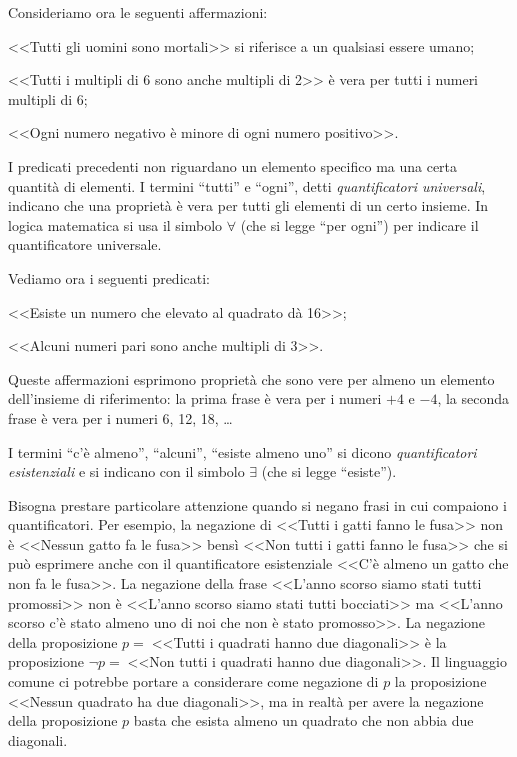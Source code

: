 Consideriamo ora le seguenti affermazioni:
\begin{itemize*}
\item <<Tutti gli uomini sono mortali>> si riferisce a un qualsiasi essere umano;
\item <<Tutti i multipli di 6 sono anche multipli di 2>> è vera per tutti i numeri multipli di 6;
\item <<Ogni numero negativo è minore di ogni numero positivo>>.
\end{itemize*}
I predicati precedenti non riguardano un elemento specifico ma una certa quantità di elementi. I termini ``tutti'' e ``ogni'', detti \emph{quantificatori universali}, indicano che una proprietà è vera per tutti gli elementi di un certo insieme. In logica matematica si usa il simbolo $\forall$ (che si legge ``per ogni'') per indicare il quantificatore universale.

Vediamo ora i seguenti predicati:
\begin{itemize*}
\item <<Esiste un numero che elevato al quadrato dà 16>>;
\item <<Alcuni numeri pari sono anche multipli di 3>>.
\end{itemize*}
Queste affermazioni esprimono proprietà che sono vere per almeno un elemento dell'insieme di riferimento: la prima frase è vera per i numeri $+4$ e $-4$, la seconda frase è vera per i numeri 6, 12, 18, \ldots{}

I termini ``c'è almeno'', ``alcuni'', ``esiste almeno uno'' si dicono \emph{quantificatori esistenziali} e si indicano con il simbolo $\exists$ (che si legge ``esiste'').

Bisogna prestare particolare attenzione quando si negano frasi in cui compaiono i quantificatori. Per esempio, la negazione di <<Tutti i gatti fanno le fusa>> non è <<Nessun gatto fa le fusa>> bensì <<Non tutti i gatti fanno le fusa>> che si può esprimere anche con il quantificatore esistenziale <<C'è almeno un gatto che non fa le fusa>>.
La negazione della frase <<L'anno scorso siamo stati tutti promossi>> non è <<L'anno scorso siamo stati tutti bocciati>> ma <<L'anno scorso c'è stato almeno uno di noi che non è stato promosso>>.
La negazione della proposizione $p =\;$<<Tutti i quadrati hanno due diagonali>> è la proposizione $\neg p =\;$<<Non tutti i quadrati hanno due diagonali>>. Il linguaggio comune ci potrebbe portare a considerare come negazione di $p$ la proposizione <<Nessun quadrato ha due diagonali>>, ma in realtà per avere la negazione della proposizione $p$ basta che esista almeno un quadrato che non abbia due diagonali.

